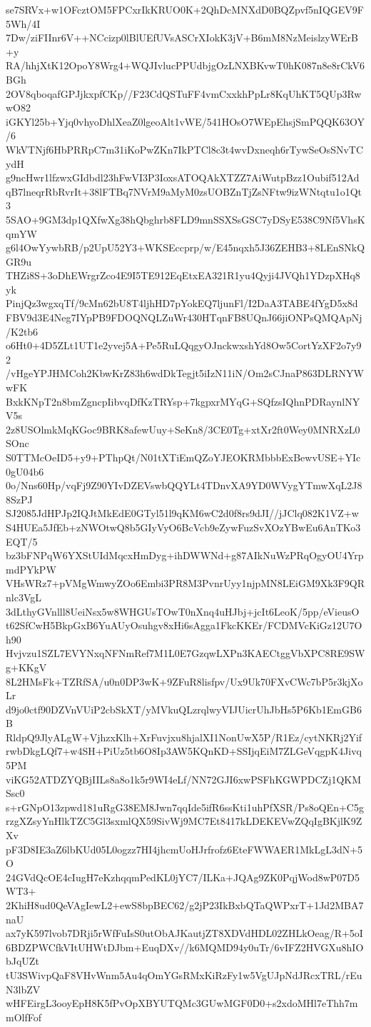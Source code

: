 se7SRVx+w1OFcztOM5FPCxrIkKRUO0K+2QhDcMNXdD0BQZpvf5nIQGEV9F5Wh/4I
7Dw/ziFIInr6V++NCcizp0lBlUEfUVsASCrXIokK3jV+B6mM8NzMeislzyWErB+y
RA/hhjXtK12OpoY8Wrg4+WQJIvlucPPUdbjgOzLNXBKvwT0hK087n8e8rCkV6BGh
2OV8qboqafGPJjkxpfCKp//F23CdQSTuFF4vmCxxkhPpLr8KqUhKT5QUp3RwwO82
iGKYl25b+Yjq0vhyoDhlXeaZ0lgeoAlt1vWE/541HOsO7WEpEhsjSmPQQK63OY/6
WkVTNjf6HbPRRpC7m31iKoPwZKn7IkPTCl8c3t4wvDxneqh6rTywSeOsSNvTCydH
g9ncHwr1lfzwxGIdbdl23hFwVI3P3IoxsATOQAkXTZZ7AiWutpBzz1Oubif512Ad
qB7lneqrRbRvrIt+38lFTBq7NVrM9aMyM0zsUOBZnTjZsNFtw9izWNtqtu1o1Qt3
5SAO+9GM3dp1QXfwXg38hQbghrb8FLD9mnSSXSsGSC7yDSyE538C9Nf5VhsKqmYW
g6l4OwYywbRB/p2UpU52Y3+WKSEccprp/w/E45nqxh5J36ZEHB3+8LEnSNkQGR9u
THZi8S+3oDhEWrgrZco4E9I5TE912EqEtxEA321R1yu4Qyji4JVQh1YDzpXHq8yk
PinjQz3wgxqTf/9cMn62bU8T4ljhHD7pYokEQ7ljunFl/I2DaA3TABE4fYgD5x8d
FBV9d3E4Neg7IYpPB9FDOQNQLZuWr430HTqnFB8UQnJ66jiONPsQMQApNj/K2tb6
o6Ht0+4D5ZLt1UT1e2yvej5A+Pe5RuLQqgyOJnckwxshYd8Ow5CortYzXF2o7y92
/vHgeYPJHMCoh2KbwKrZ83h6wdDkTegjt5iIzN11iN/Om2sCJnaP863DLRNYWwFK
BxkKNpT2n8bmZgncpIibvqDfKzTRYsp+7kgpxrMYqG+SQfzsIQhnPDRaynlNYV5s
2z8USOlmkMqKGoc9BRK8afewUuy+SeKn8/3CE0Tg+xtXr2ft0Wey0MNRXzL0SOnc
S0TTMcOeID5+y9+PThpQt/N01tXTiEmQZoYJEOKRMbbbExBewvUSE+YIc0gU04b6
0o/Nns60Hp/vqFj9Z90YIvDZEVswbQQYLt4TDnvXA9YD0WVygYTmwXqL2J88SzPJ
SJ2085JdHPJp2IQJtMkEdE0GTyl51l9qKM6wC2d0f8rs9dJI//jJClq082K1VZ+w
S4HUEa5JfEb+zNWOtwQ8b5GIyVyO6BcVcb9eZywFuzSvXOzYBwEu6AnTKo3EQT/5
bz3bFNPqW6YXStUIdMqcxHmDyg+ihDWWNd+g87AIkNuWzPRqOgyOU4YrpmdPYkPW
VHsWRz7+pVMgWmwyZOo6Embi3PR8M3PvnrUyy1njpMN8LEiGM9Xk3F9QRnlc3VgL
3dLthyGVnlll8UeiNsx5w8WHGUsTOwT0nXnq4uHJbj+jcIt6LeoK/5pp/eVieusO
t62SfCwH5BkpGxB6YuAUyOsuhgv8xHi6sAgga1FkcKKEr/FCDMVcKiGz12U7Oh90
Hvjvzu1SZL7EVYNxqNFNmRef7M1L0E7GzqwLXPn3KAECtggVbXPC8RE9SWg+KKgV
8L2HMsFk+TZRfSA/u0n0DP3wK+9ZFuR8lisfpv/Ux9Uk70FXvCWc7bP5r3kjXoLr
d9jo0ctf90DZVnVUiP2cbSkXT/yMVkuQLzrqlwyVIJUicrUhJbHs5P6Kb1EmGB6B
RldpQ9JlyALgW+VjhzxKlh+XrFuvjxu8hjalXI1NonUwX5P/R1Ez/cytNKRj2Yif
rwbDkgLQf7+w4SH+PiUz5tb6O8Ip3AW5KQnKD+SSIjqEiM7ZLGeVqgpK4Jivq5PM
viKG52ATDZYQBjIILs8a8o1k5r9WI4eLf/NN72GJI6xwPSFhKGWPDCZj1QKMSsc0
s+rGNpO13zpwd181uRgG38EM8Jwn7qqIde5ifR6ssKti1uhPfXSR/Ps8oQEn+C5g
rzgXZsyYnHlkTZC5Gl3sxmlQX59SivWj9MC7Et8417kLDEKEVwZQqIgBKjlK9ZXv
pF3D8IE3aZ6lbKUd05L0ogzz7HI4jhcmUoHJrfrofz6EteFWWAER1MkLgL3dN+5O
24GVdQcOE4cIugH7eKzhqqmPedKL0jYC7/ILKa+JQAg9ZK0PqjWod8wP07D5WT3+
2KhiH8ud0QeVAgIewL2+ewS8bpBEC62/g2jP23IkBxbQTaQWPxrT+1Jd2MBA7naU
ax7yK597lvob7DRji5rWfFuIsS0utObAJKautjZT8XDVdHDL02ZHLkOeag/R+5oI
6BDZPWCfkVItUHWtDJbm+EuqDXv//k6MQMD94y0uTr/6vIFZ2HVGXu8hIObJqUZt
tU3SWivpQaF8VHvWnm5Au4qOmYGsRMxKiRzFy1w5VgUJpNdJRcxTRL/rEuN3lbZV
wHFEirgL3ooyEpH8K5fPvOpXBYUTQMc3GUwMGF0D0+s2xdoMHl7eThh7mmOlfFof
